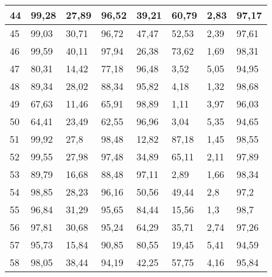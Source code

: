 \begin{longtable}[c]{|l|l|l|l|l|l|l|l|}
44              & 99,28        & 27,89        & 96,52       & 39,21         & 60,79         & 2,83          & 97,17         \\ \hline
45              & 99,03        & 30,71        & 96,72       & 47,47         & 52,53         & 2,39          & 97,61         \\ \hline
46              & 99,59        & 40,11        & 97,94       & 26,38         & 73,62         & 1,69          & 98,31         \\ \hline
47              & 80,31        & 14,42        & 77,18       & 96,48         & 3,52          & 5,05          & 94,95         \\ \hline
48              & 89,34        & 28,02        & 88,34       & 95,82         & 4,18          & 1,32          & 98,68         \\ \hline
49              & 67,63        & 11,46        & 65,91       & 98,89         & 1,11          & 3,97          & 96,03         \\ \hline
50              & 64,41        & 23,49        & 62,55       & 96,96         & 3,04          & 5,35          & 94,65         \\ \hline
51              & 99,92        & 27,8         & 98,48       & 12,82         & 87,18         & 1,45          & 98,55         \\ \hline
52              & 99,55        & 27,98        & 97,48       & 34,89         & 65,11         & 2,11          & 97,89         \\ \hline
53              & 89,79        & 16,68        & 88,48       & 97,11         & 2,89          & 1,66          & 98,34         \\ \hline
54              & 98,85        & 28,23        & 96,16       & 50,56         & 49,44         & 2,8           & 97,2          \\ \hline
55              & 96,84        & 31,29        & 95,65       & 84,44         & 15,56         & 1,3           & 98,7          \\ \hline
56              & 97,81        & 30,68        & 95,24       & 64,29         & 35,71         & 2,74          & 97,26         \\ \hline
57              & 95,73        & 15,84        & 90,85       & 80,55         & 19,45         & 5,41          & 94,59         \\ \hline
58              & 98,05        & 38,44        & 94,19       & 42,25         & 57,75         & 4,16          & 95,84         \\ \hline

\end{longtable}
